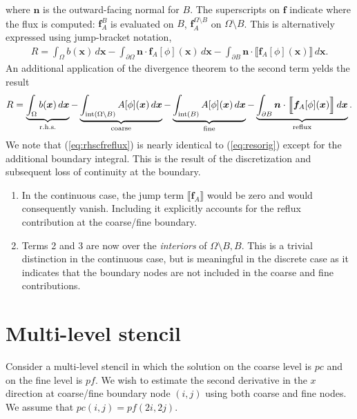 \documentclass{article}
\begin{document}
where $\bm{n}$ is the outward-facing normal for $B$.
The superscripts on $\bm{f}$ indicate where the flux is computed: $\bm{f}_A^{B}$ is evaluated on $B$, $\bm{f}_A^{\Omega\setminus B}$ on $\Omega\setminus B$.
This is alternatively expressed using jump-bracket notation,
\begin{align}
  R = 
  \int_\Omega b(\bm{x})\,d\bm{x} 
  - \int_{\partial \Omega} \bm{n}\cdot\bm{f}_A[\phi](\bm{x})\,d\bm{x}
  - \int_{\partial B} \bm{n}\cdot\Big\llbracket\bm{f}_A[\phi](\bm{x})\Big\rrbracket\,d\bm{x}.
\end{align}
An additional application of the divergence theorem to the second term yelds the result
\begin{align}\label{eq:rhscfreflux}
  R = 
  \underbrace{\int_\Omega b(\bm{x})\,d\bm{x} }_{\text{r.h.s.}}
  - \underbrace{\int_{\operatorname{int}(\Omega\setminus B)} A[\phi](\bm{x})\,d\bm{x}}_{\text{coarse}}
  - \underbrace{\int_{\operatorname{int}(B)} A[\phi](\bm{x})\,d\bm{x}}_{\text{fine}}
  - \underbrace{\int_{\partial B} \bm{n}\cdot\Big\llbracket\bm{f}_A[\phi](\bm{x})\Big\rrbracket\,d\bm{x}}_{\text{reflux}}.
\end{align}
We note that (\ref{eq:rhscfreflux}) is nearly identical to (\ref{eq:resorig}) except for the additional boundary integral. 
This is the result of the discretization and subsequent loss of continuity at the boundary.
\begin{enumerate}
\item In the continuous case, the jump term $\llbracket\bm{f}_A\rrbracket$ would be zero and would consequently vanish.
  Including it explicitly accounts for the reflux contribution at the coarse/fine boundary.
\item Terms 2 and 3 are now over the {\it interiors} of $\Omega\setminus B,B$.
  This is a trivial distinction in the continuous case, but is meaningful in the discrete case as it indicates that the boundary nodes are not included in the coarse and fine contributions.
\end{enumerate}


\section{Multi-level stencil}

Consider a multi-level stencil in which the solution on the coarse level is $pc$ and on the fine level is $pf$.
We wish to estimate the second derivative in the $x$ direction at coarse/fine boundary node $(i,j)$ using both coarse and fine nodes.
We assume that $pc(i,j) = pf(2i,2j)$.
\end{document}
